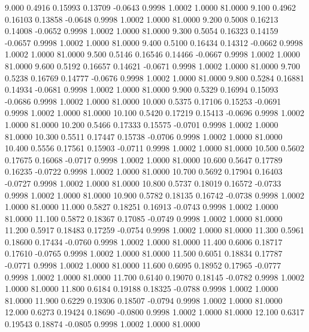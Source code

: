    9.000   0.4916   0.15993   0.13709  -0.0643   0.9998   1.0002   1.0000  81.0000
   9.100   0.4962   0.16103   0.13858  -0.0648   0.9998   1.0002   1.0000  81.0000
   9.200   0.5008   0.16213   0.14008  -0.0652   0.9998   1.0002   1.0000  81.0000
   9.300   0.5054   0.16323   0.14159  -0.0657   0.9998   1.0002   1.0000  81.0000
   9.400   0.5100   0.16434   0.14312  -0.0662   0.9998   1.0002   1.0000  81.0000
   9.500   0.5146   0.16546   0.14466  -0.0667   0.9998   1.0002   1.0000  81.0000
   9.600   0.5192   0.16657   0.14621  -0.0671   0.9998   1.0002   1.0000  81.0000
   9.700   0.5238   0.16769   0.14777  -0.0676   0.9998   1.0002   1.0000  81.0000
   9.800   0.5284   0.16881   0.14934  -0.0681   0.9998   1.0002   1.0000  81.0000
   9.900   0.5329   0.16994   0.15093  -0.0686   0.9998   1.0002   1.0000  81.0000
  10.000   0.5375   0.17106   0.15253  -0.0691   0.9998   1.0002   1.0000  81.0000
  10.100   0.5420   0.17219   0.15413  -0.0696   0.9998   1.0002   1.0000  81.0000
  10.200   0.5466   0.17333   0.15575  -0.0701   0.9998   1.0002   1.0000  81.0000
  10.300   0.5511   0.17447   0.15738  -0.0706   0.9998   1.0002   1.0000  81.0000
  10.400   0.5556   0.17561   0.15903  -0.0711   0.9998   1.0002   1.0000  81.0000
  10.500   0.5602   0.17675   0.16068  -0.0717   0.9998   1.0002   1.0000  81.0000
  10.600   0.5647   0.17789   0.16235  -0.0722   0.9998   1.0002   1.0000  81.0000
  10.700   0.5692   0.17904   0.16403  -0.0727   0.9998   1.0002   1.0000  81.0000
  10.800   0.5737   0.18019   0.16572  -0.0733   0.9998   1.0002   1.0000  81.0000
  10.900   0.5782   0.18135   0.16742  -0.0738   0.9998   1.0002   1.0000  81.0000
  11.000   0.5827   0.18251   0.16913  -0.0743   0.9998   1.0002   1.0000  81.0000
  11.100   0.5872   0.18367   0.17085  -0.0749   0.9998   1.0002   1.0000  81.0000
  11.200   0.5917   0.18483   0.17259  -0.0754   0.9998   1.0002   1.0000  81.0000
  11.300   0.5961   0.18600   0.17434  -0.0760   0.9998   1.0002   1.0000  81.0000
  11.400   0.6006   0.18717   0.17610  -0.0765   0.9998   1.0002   1.0000  81.0000
  11.500   0.6051   0.18834   0.17787  -0.0771   0.9998   1.0002   1.0000  81.0000
  11.600   0.6095   0.18952   0.17965  -0.0777   0.9998   1.0002   1.0000  81.0000
  11.700   0.6140   0.19070   0.18145  -0.0782   0.9998   1.0002   1.0000  81.0000
  11.800   0.6184   0.19188   0.18325  -0.0788   0.9998   1.0002   1.0000  81.0000
  11.900   0.6229   0.19306   0.18507  -0.0794   0.9998   1.0002   1.0000  81.0000
  12.000   0.6273   0.19424   0.18690  -0.0800   0.9998   1.0002   1.0000  81.0000
  12.100   0.6317   0.19543   0.18874  -0.0805   0.9998   1.0002   1.0000  81.0000
